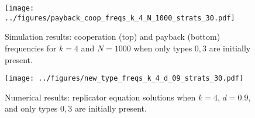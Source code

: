 \documentclass[13pt]{amsart}
\begin{document}
\begin{figure}
    \texttt{[image: ../figures/payback\_coop\_freqs\_k\_4\_N\_1000\_strats\_30.pdf]}
    \caption{Simulation results: cooperation (top) and payback (bottom) frequencies for $k = 4$ and $N = 1000$ when only types $0, 3$ are initially present.}
\end{figure}

\begin{figure}
    \texttt{[image: ../figures/new\_type\_freqs\_k\_4\_d\_09\_strats\_30.pdf]}
    \caption{Numerical results: replicator equation solutions when $k = 4$, $d = 0.9$, and only types $0, 3$ are initially present.}
\end{figure}
\end{document}
